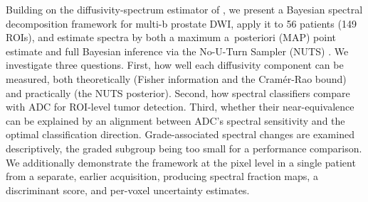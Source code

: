 Building on the diffusivity-spectrum estimator of \citet{wells2022estimation}, we present a Bayesian spectral decomposition framework for multi-b prostate DWI, apply it to 56 patients (149 ROIs), and estimate spectra by both a maximum a~posteriori (MAP) point estimate and full Bayesian inference via the No-U-Turn Sampler (NUTS) \citep{hoffman2014nuts}.
We investigate three questions. First, how well each diffusivity component can be measured, both theoretically (Fisher information and the Cram\'er-Rao bound) and practically (the NUTS posterior). Second, how spectral classifiers compare with ADC for ROI-level tumor detection. Third, whether their near-equivalence can be explained by an alignment between ADC's spectral sensitivity and the optimal classification direction. Grade-associated spectral changes are examined descriptively, the graded subgroup being too small for a performance comparison.
We additionally demonstrate the framework at the pixel level in a single patient from a separate, earlier acquisition, producing spectral fraction maps, a discriminant score, and per-voxel uncertainty estimates.
